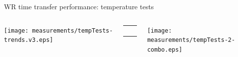 \documentclass[compress,red]{beamer}
\newcommand{\backupend}{
   \addtocounter{framenumberappendix}{-\value{framenumber}}
   \addtocounter{framenumber}{\value{framenumberappendix}} 
}
\begin{document}
\begin{frame}{WR time transfer performance: temperature tests}

  \begin{columns}[c]
		\hspace{-1.0cm}
		\begin{center}
		\texttt{[image: measurements/tempTests-trends.v3.eps]}
		\end{center}

		\begin{center}
		  \begin{table}[!t] \footnotesize 
		  \begin{tabular}{ c  c }     
		  \multicolumn{2}{c}{ }       \\         
		   \multicolumn{2}{c}{ }       \\    
		     &    \\ 
		    &     \\ 
		  \end{tabular}
		  \end{table}   		
		\end{center}

		\hspace{-0.8cm}
		\begin{center}
		\texttt{[image: measurements/tempTests-2-combo.eps]}
		\end{center}


  \end{columns} 
\end{frame}



\backupend

\end{document}
